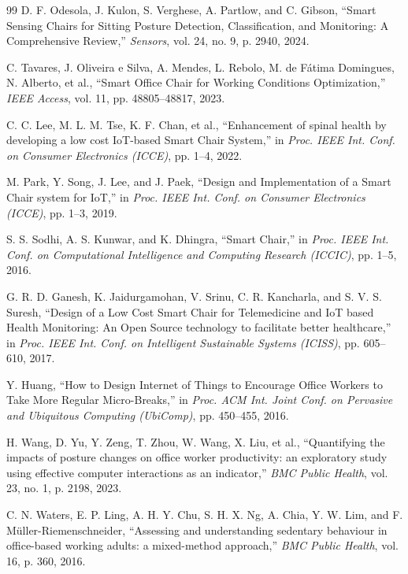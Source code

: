 \documentclass[conference]{IEEEtran}
\begin{document}
\begin{thebibliography}{99}
 D. F. Odesola, J. Kulon, S. Verghese, A. Partlow, and C. Gibson, ``Smart Sensing Chairs for Sitting Posture Detection, Classification, and Monitoring: A Comprehensive Review,'' \textit{Sensors}, vol. 24, no. 9, p. 2940, 2024.

 C. Tavares, J. Oliveira e Silva, A. Mendes, L. Rebolo, M. de F\'atima Domingues, N. Alberto, et al., ``Smart Office Chair for Working Conditions Optimization,'' \textit{IEEE Access}, vol. 11, pp. 48805--48817, 2023.

 C. C. Lee, M. L. M. Tse, K. F. Chan, et al., ``Enhancement of spinal health by developing a low cost IoT-based Smart Chair System,'' in \textit{Proc. IEEE Int. Conf. on Consumer Electronics (ICCE)}, pp. 1--4, 2022.

 M. Park, Y. Song, J. Lee, and J. Paek, ``Design and Implementation of a Smart Chair system for IoT,'' in \textit{Proc. IEEE Int. Conf. on Consumer Electronics (ICCE)}, pp. 1--3, 2019.

 S. S. Sodhi, A. S. Kunwar, and K. Dhingra, ``Smart Chair,'' in \textit{Proc. IEEE Int. Conf. on Computational Intelligence and Computing Research (ICCIC)}, pp. 1--5, 2016.

 G. R. D. Ganesh, K. Jaidurgamohan, V. Srinu, C. R. Kancharla, and S. V. S. Suresh, ``Design of a Low Cost Smart Chair for Telemedicine and IoT based Health Monitoring: An Open Source technology to facilitate better healthcare,'' in \textit{Proc. IEEE Int. Conf. on Intelligent Sustainable Systems (ICISS)}, pp. 605--610, 2017.

 Y. Huang, ``How to Design Internet of Things to Encourage Office Workers to Take More Regular Micro-Breaks,'' in \textit{Proc. ACM Int. Joint Conf. on Pervasive and Ubiquitous Computing (UbiComp)}, pp. 450--455, 2016.

 H. Wang, D. Yu, Y. Zeng, T. Zhou, W. Wang, X. Liu, et al., ``Quantifying the impacts of posture changes on office worker productivity: an exploratory study using effective computer interactions as an indicator,'' \textit{BMC Public Health}, vol. 23, no. 1, p. 2198, 2023.

 C. N. Waters, E. P. Ling, A. H. Y. Chu, S. H. X. Ng, A. Chia, Y. W. Lim, and F. M\"uller-Riemenschneider, ``Assessing and understanding sedentary behaviour in office-based working adults: a mixed-method approach,'' \textit{BMC Public Health}, vol. 16, p. 360, 2016.


\end{thebibliography}
\end{document}
